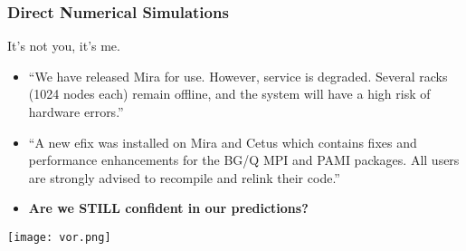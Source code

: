 \documentclass[mathserif]{beamer}
\begin{document}
\begin{frame}
  \frametitle{Direct Numerical Simulations}

      \begin{block}{It's not you, it's me.}
        \begin{itemize}
	 \item ``We have released Mira for use.  However, service is degraded. Several
	       racks (1024 nodes each) remain offline, and the system will have a high
	       risk of hardware errors.''
	 \item ``A new efix was installed on Mira and Cetus which contains
	       fixes and performance enhancements for the BG/Q MPI and
	       PAMI packages.  All users are strongly advised to
	       recompile and relink their code.''
	 \item {\bf Are we STILL confident in our predictions?}
        \end{itemize}
      \end{block}
 \begin{center}
  \center
  \texttt{[image: vor.png]}\\
 \end{center}
\end{frame}


\end{document}
